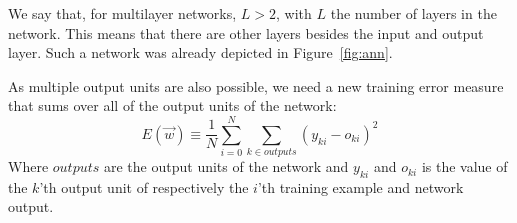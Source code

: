 We say that, for multilayer networks, $L>2$, with $L$ the number of layers in the network.
This means that there are other layers besides the input and output layer. Such a network was already depicted in Figure~\ref{fig:ann}.

As multiple output units are also possible, we need a new training error measure that sums over all of the output units of the network:
\begin{equation}
    E(\overrightarrow{w}) \equiv \frac{1}{N} \sum_{i=0}^N \sum_{k \in outputs} (y_{ki} - o_{ki})^2
\end{equation}
Where $outputs$ are the output units of the network and $y_{ki}$ and $o_{ki}$ is the value of the $k$'th output unit of respectively the $i$'th training example and network output.\\

